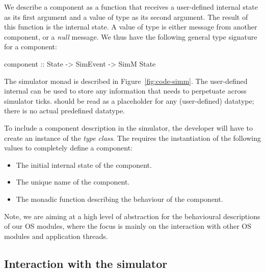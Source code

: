 We describe a component as a function that receives a user-defined internal state as its first argument and a value of type  as its second argument.
The result of this function is the internal state.
A value of type  is either message from another component, or a \emph{null} message.
We thus have the following general type signature for a component:
\begin{code}
component :: State -> SimEvent -> SimM State
\end{code}

The simulator monad  is described in Figure~\ref{fig:code-simm}. 
The user-defined internal  can be used to store any information that needs to perpetuate across simulator ticks.
 should be read as a placeholder for any (user-defined) datatype; there is no actual predefined  datatype.

To include a component description in the simulator, the developer will have to create an instance of the  \emph{type class}.
The  requires the instantiation of the following values to completely define a component:

\begin{itemize}
  \item The initial internal state of the component.
  \item The unique name of the component.
  \item The monadic function describing the behaviour of the component.
\end{itemize}

Note, we are aiming at a high level of abstraction for the behavioural descriptions of our OS modules, where the focus is mainly on the interaction with other OS modules and application threads.


\subsection{Interaction with the simulator}


